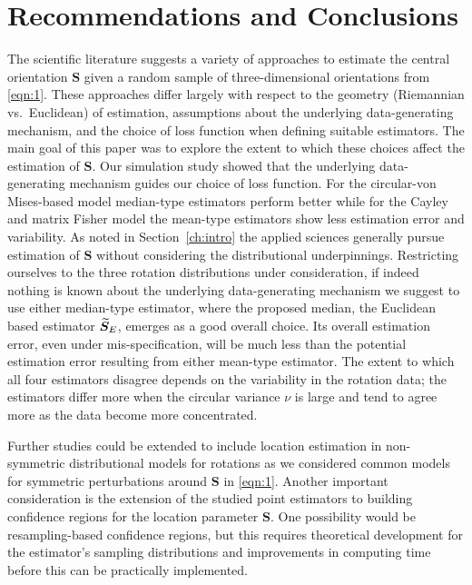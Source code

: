 \section{Recommendations and Conclusions}\label{sec:disc}

The scientific literature suggests a variety of approaches to estimate the central orientation $\bm S$ given a random sample of three-dimensional orientations from \eqref{eqn:1}. These approaches differ largely with respect to the geometry (Riemannian vs.~Euclidean) of estimation, assumptions about the underlying data-generating mechanism, and the choice of loss function when defining suitable estimators. The main goal of this paper was to explore the extent to which these choices affect the estimation of $\bm S$. 
Our simulation study showed that  the underlying data-generating mechanism guides our choice of loss function.  For the circular-von Mises-based model median-type estimators perform better while for the Cayley and matrix Fisher model the mean-type estimators show less estimation error and variability. As noted in Section~\ref{ch:intro} the applied sciences generally pursue estimation of $\bm S$ without considering the distributional underpinnings. Restricting ourselves to the three rotation distributions under consideration,  if indeed nothing is known about the underlying data-generating mechanism we suggest to use either median-type estimator, where the proposed median, the Euclidean based estimator ${\widetilde{\bm S}_E}$, emerges as a good overall choice. Its overall estimation error, even under mis-specification, will be much less than the potential estimation error resulting from either mean-type estimator. The extent to which all four estimators disagree depends on the variability in the rotation data; the estimators differ more when the circular variance $\nu$ is large and tend to agree more as the data become more concentrated.  
   
Further studies could be extended to include location estimation in non-symmetric distributional models for rotations as we considered common models for symmetric perturbations around $\bm S$ in \eqref{eqn:1}. Another important consideration is the extension of the studied point estimators to building confidence regions for the location parameter $\bm S$. One possibility would be resampling-based confidence regions, but this requires theoretical development for the estimator's sampling distributions and improvements in computing time before this can be practically implemented. \\

